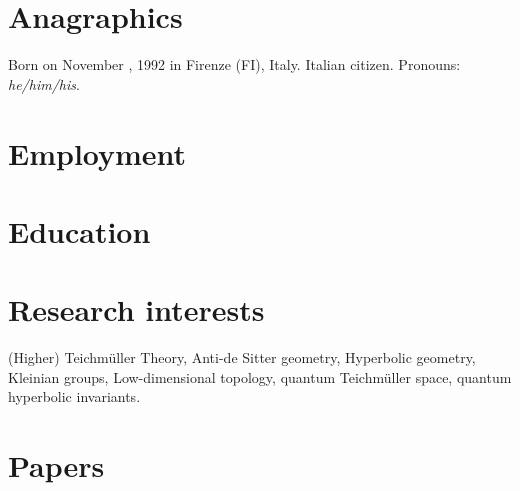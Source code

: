 \documentclass{prometheus_cv}
\begin{document}
\thispagestyle{empty}					%
\pagestyle{fancy}			 		%

\vspace*{-1cm}
\centering 


\vspace*{0.4cm}

\section{Anagraphics}

\raggedright

Born on November , 1992 in Firenze (FI), Italy. Italian citizen. Pronouns: \emph{he/him/his}.


\section{Employment}


\section{Education}


\section{Research interests}


(Higher) Teichm{\"u}ller Theory, Anti-de Sitter geometry, Hyperbolic geometry, Kleinian groups, Low-dimensional topology, quantum Teichm\"uller space, quantum hyperbolic invariants.



\section{Papers}

\end{document}
